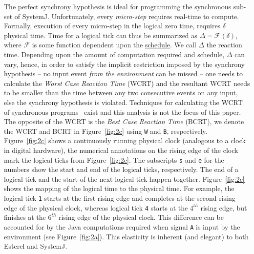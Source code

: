 The perfect synchrony hypothesis is ideal for programming the
synchronous sub-set of SystemJ. Unfortunately, every \textit{micro-step}
requires real-time to compute. Formally, execution of every micro-step
in the logical zero time, requires $\delta$ physical time. Time for a
logical tick can thus be summarized as $\Delta = \mathcal{F} (\delta)$,
where $\mathcal{F}$ is some function dependent upon the
\underline{schedule}. We call $\Delta$ the reaction time. Depending upon
the amount of computation required and schedule, $\Delta$ can vary,
hence, in order to satisfy the implicit restriction imposed by the
synchrony hypothesis -- no input event \textit{from the environment} can
be missed -- one needs to calculate the \textit{Worst Case Reaction
  Time} (WCRT) and the resultant WCRT needs to be smaller than the time
between any two consecutive events on any input, else the synchrony
hypothesis is violated. Techniques for calculating the WCRT of
synchronous programs~\cite{boldt07} exist and this analysis is not the
focus of this paper. The opposite of the WCRT is the \textit{Best Case
  Reaction Time} (BCRT), we denote the WCRT and BCRT in
Figure~\ref{fig:2c} using \texttt{W} and \texttt{B},
respectively. Figure~\ref{fig:2c} shows a continuously running physical
clock (analogous to a clock in digital hardware), the numerical
annotations on the rising edge of the clock mark the logical ticks from
Figure~\ref{fig:2c}. The subscripts \texttt{s} and \texttt{e} for the
numbers show the start and end of the logical ticks, respectively. The
end of a logical tick and the start of the next logical tick happen
together. Figure~\ref{fig:2c} shows the mapping of the logical time to
the physical time. For example, the logical tick \texttt{1} starts at
the first rising edge and completes at the second rising edge of the
physical clock, whereas logical tick \texttt{4} starts at the $4^{th}$
rising edge, but finishes at the $6^{th}$ rising edge of the physical
clock. This difference can be accounted for by the Java computations
required when signal \texttt{A} is input by the environment (see
Figure~\ref{fig:2a}). This elasticity is inherent (and elegant) to both
Esterel and SystemJ.



